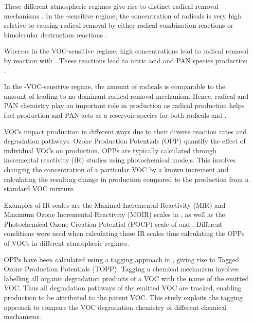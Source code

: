 These different atmospheric regimes give rise to distinct radical removal mechanisms \citep{Kleinman:1991}. 
In the -sensitive regime, the concentration of radicals is very high relative to  causing radical removal by either radical combination reactions  or bimolecular destruction reactions  \citep{Kleinman:1994}.
\begin{reactionlist}
\end{reactionlist}
Whereas in the VOC-sensitive regime, high  concentrations lead to radical removal by reaction with . 
These reactions lead to nitric acid  and PAN species production .
\begin{reactionlist}
\end{reactionlist}
In the -VOC-sensitive regime, the amount of radicals is comparable to the amount of  leading to no dominant radical removal mechanism. 
Hence, radical and PAN chemistry play an important role in  production as radical production helps fuel  production and PAN acts as a reservoir species for both radicals and . 

VOCs impact  production in different ways due to their diverse reaction rates and degradation pathways. 
Ozone Production Potentials (OPP) quantify the effect of individual VOCs on  production. 
OPPs are typically calculated through incremental reactivity (IR) studies using photochemical models. 
This involves changing the concentration of a particular VOC by a known increment and calculating the resulting change in  production compared to the  production from a standard VOC mixture. 

Examples of IR scales are the Maximal Incremental Reactivity (MIR) and Maximum Ozone Incremental Reactivity (MOIR) scales in \citet{Carter:1994}, as well as the Photochemical Ozone Creation Potential (POCP) scale of \citet{Derwent:1996} and \citet{Derwent:1998}. 
Different  conditions were used when calculating these IR scales thus calculating the OPPs of VOCs in different atmospheric regimes.

OPPs have been calculated using a tagging approach in \citet{Butler:2011}, giving rise to Tagged Ozone Production Potentials (TOPP). 
Tagging a chemical mechanism involves labelling all organic degradation products of a VOC with the name of the emitted VOC.
Thus all degradation pathways of the emitted VOC are tracked, enabling  production to be attributed to the parent VOC.
This study exploits the tagging approach to compare the VOC degradation chemistry of different chemical mechanisms. 

